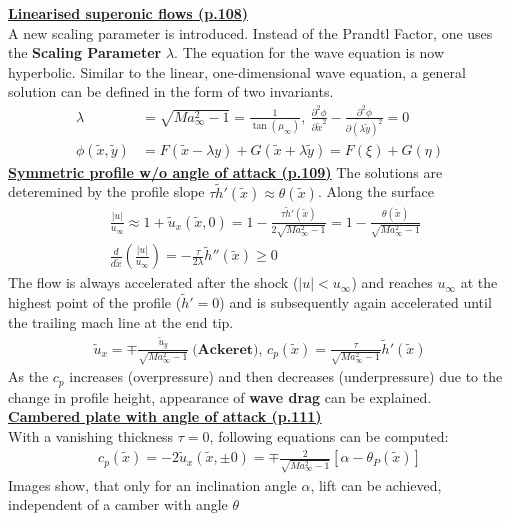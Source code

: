 \documentclass[8pt, landscape, fleqn]{scrartcl}
\begin{document}
\begin{multicols*}{3}
\underline{\textbf{Linearised superonic flows (p.108)}} \\
A new scaling parameter is introduced. Instead of the Prandtl Factor, one uses the \textbf{Scaling Parameter} $\lambda$. The equation for the wave equation is now hyperbolic. Similar to the linear, one-dimensional wave equation, a general solution can be defined in the form of two invariants.
\begin{align*}
    \lambda &= \sqrt{Ma_\infty^2-1} = \frac{1}{\tan(\mu_\infty)},~\frac{\partial^2 \phi}{\partial \tilde{x}^2} - \frac{\partial^2 \phi}{\partial(\lambda \tilde{y})^2} = 0 \\
    \phi(\tilde{x},\tilde{y}) &= F(\tilde{x}-\lambda y) + G(\tilde{x}+\lambda \tilde{y}) = F(\xi) + G(\eta)
\end{align*}
\underline{\textbf{Symmetric profile w/o angle of attack (p.109)}}
The solutions are deteremined by the profile slope $\tau \tilde{h}'(\tilde{x}) \approx \theta(\tilde{x})$. Along the surface
\begin{align*}
    &\frac{|u|}{u_\infty} \approx 1 + \tilde{u}_x(\tilde{x},0) = 1-\frac{\tau \tilde{h}'(\tilde{x})}{2\sqrt{Ma_\infty^2-1}} = 1 - \frac{\theta(\tilde{x})}{\sqrt{Ma_\infty^2-1}}\\
    &\frac{d}{d\tilde{x}}\left( \frac{|u|}{u_\infty} \right) = - \frac{\tau}{2\lambda} \tilde{h}''(\tilde{x}) \geq 0
\end{align*}
The flow is always accelerated after the shock ($|u| < u_\infty$) and reaches $u_\infty$ at the highest point of the profile ($\tilde{h}' = 0$) and is subsequently again accelerated until the trailing mach line at the end tip.
\begin{align*}
    \tilde{u}_x = \mp \frac{\tilde{u}_y}{\sqrt{Ma_\infty^2-1}}~\textbf{(Ackeret), } c_p(\tilde{x}) = \frac{\tau}{\sqrt{Ma_\infty^2-1}}\tilde{h}'(\tilde{x})
\end{align*}
As the $c_p$ increases (overpressure) and then decreases (underpressure) due to the change in profile height, appearance of \textbf{wave drag} can be explained.\\

\underline{\textbf{Cambered plate with angle of attack (p.111)}} \\
With a vanishing thickness $\tau = 0$, following equations can be computed:
\begin{align*}
    c_p(\tilde{x}) = -2\tilde{u}_x(\tilde{x}, \pm 0) = \mp \frac{2}{\sqrt{Ma_\infty^2-1}}\left[ \alpha - \theta_P(\tilde{x}) \right]
\end{align*}
Images show, that only for an inclination angle $\alpha$, lift can be achieved, independent of a camber with angle $\theta$\\


\end{multicols*}
\end{document}
